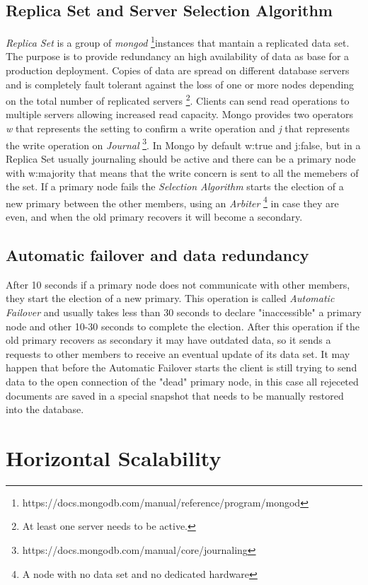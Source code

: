 \subsection{Replica Set and Server Selection Algorithm}
\textit{Replica Set} is a group of \textit{mongod} \footnote{https://docs.mongodb.com/manual/reference/program/mongod}instances that mantain a replicated data set. The purpose is to provide redundancy an high availability of data as base for a production deployment. Copies of data are spread on different database servers and is completely fault tolerant against the loss of one or more nodes depending on the total number of replicated servers \footnote{At least one server needs to be active.}.
Clients can send read operations to multiple servers allowing increased read capacity. Mongo provides two operators \textit{w} that represents the setting to confirm a write operation and \textit{j} that represents the write operation on \textit{Journal} \footnote{https://docs.mongodb.com/manual/core/journaling}.
In Mongo by default w:true and j:false, but in a Replica Set  usually journaling should be active and there can be a primary node with w:majority that means that the write concern is sent to all the memebers of the set.
If a primary node fails the \textit{Selection Algorithm} starts the election of  a new primary between the other members, using an \textit{Arbiter} \footnote{A node with no data set and no dedicated hardware} in case they are even, and when the old primary recovers it will become a secondary.

\subsection{Automatic failover and data redundancy}
After 10 seconds if a primary node does not communicate with other members, they start the election of a new primary. This operation is called \textit{Automatic Failover} and usually takes less than 30 seconds to declare "inaccessible" a primary node and other 10-30 seconds to complete the election.
After this operation if the old primary recovers as secondary it may have outdated data, so it sends a requests to other members to receive an eventual update of its data set.
It may happen that before the Automatic Failover starts the client is still trying to send data to the open connection of the "dead" primary node, in this case all rejeceted documents are saved in a special snapshot that needs to be manually restored into the database.

\section{Horizontal Scalability}
\label{sec:6}

